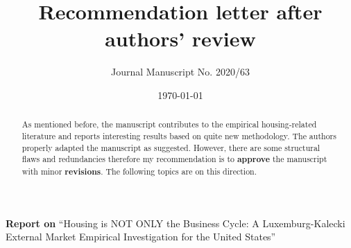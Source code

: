 \documentclass[11pt]{article}
\author{Journal Manuscript No. 2020/63}
\date{\today}
\title{Recommendation letter after authors' review}
\begin{document}
\maketitle
\noindent \textbf{Report on} ``Housing is NOT ONLY the Business Cycle: A Luxemburg-Kalecki External Market Empirical Investigation for the United States'' 


\begin{abstract}
As mentioned before, the manuscript contributes to the empirical housing-related literature and reports interesting results based on quite  new methodology.
The authors properly adapted the manuscript as suggested.
However, there are some structural flaws and redundancies therefore my recommendation is to \textbf{approve} the manuscript with minor \textbf{revisions}.
The following topics are on this direction.
\end{abstract}
\end{document}
